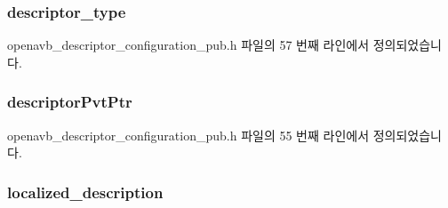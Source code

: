 \subsubsection[{\texorpdfstring{descriptor\+\_\+type}{descriptor_type}}]{ descriptor\+\_\+type}\hypertarget{structopenavb__aem__descriptor__configuration__t_a1e231d7874aada5925b29affc76782cc}{}\label{structopenavb__aem__descriptor__configuration__t_a1e231d7874aada5925b29affc76782cc}


openavb\+\_\+descriptor\+\_\+configuration\+\_\+pub.\+h 파일의 57 번째 라인에서 정의되었습니다.

\subsubsection[{\texorpdfstring{descriptor\+Pvt\+Ptr}{descriptorPvtPtr}}]{ descriptor\+Pvt\+Ptr}\hypertarget{structopenavb__aem__descriptor__configuration__t_a302e92fd6cf4d398d5305395359fb157}{}\label{structopenavb__aem__descriptor__configuration__t_a302e92fd6cf4d398d5305395359fb157}


openavb\+\_\+descriptor\+\_\+configuration\+\_\+pub.\+h 파일의 55 번째 라인에서 정의되었습니다.

\subsubsection[{\texorpdfstring{localized\+\_\+description}{localized_description}}]{ localized\+\_\+description}\hypertarget{structopenavb__aem__descriptor__configuration__t_afd613361c59409fb6dcc0c237d1cfbfd}{}\label{structopenavb__aem__descriptor__configuration__t_afd613361c59409fb6dcc0c237d1cfbfd}


